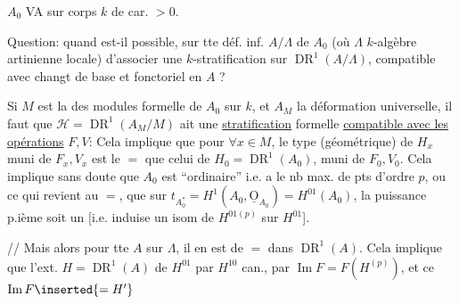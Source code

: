 $A_0$ VA sur corps $k$ de car. $>0$.

Question: quand est-il possible, sur tte déf. inf. $A/\Lambda$ de $A_0$ (où $\Lambda$ $k$-algèbre artinienne locale) d'associer une $k$-stratification sur $\operatorname{DR}^1(A/\Lambda)$, compatible avec changt de base et fonctoriel en $A$ ?

Si $M$ est la  des modules formelle de $A_0$ sur $k$,  et $A_M$ la déformation universelle, il faut que $\mathcal H=\operatorname{DR}^1(A_M/M)$ ait une \uline{stratification} formelle \uline{compatible avec les opérations} $F,V$:
Cela implique que pour $\forall x\in M$, le type (géométrique) de $H_x$ muni de $F_x,V_x$ est le $=$ que celui de $H_0=\operatorname{DR}^1(A_0)$, muni de $F_0,V_0$. Cela implique sans doute que $A_0$ est ``ordinaire'' i.e. a le nb max. de pts d'ordre $p$, ou ce qui revient au $=$, que sur $t_{A_0^*}=H^1(A_0,\underline{\mathrm O}_{A_0})=H^{01}(A_0)$, la puissance p.ième soit un  [i.e. induise un isom de $H^{01(p)}$ sur $H^{01}$].


// Mais alors  pour tte $A$ sur $\Lambda$, il en est de $=$ dans $\operatorname{DR}^1(A)$. Cela implique que l'ext. $H=\operatorname{DR}^1(A)$ de $H^{01}$ par $H^{10}$  can., par $\operatorname{Im}F=F(H^{(p)})$, et ce $\operatorname{Im}F\inserted{=H'}$ 
